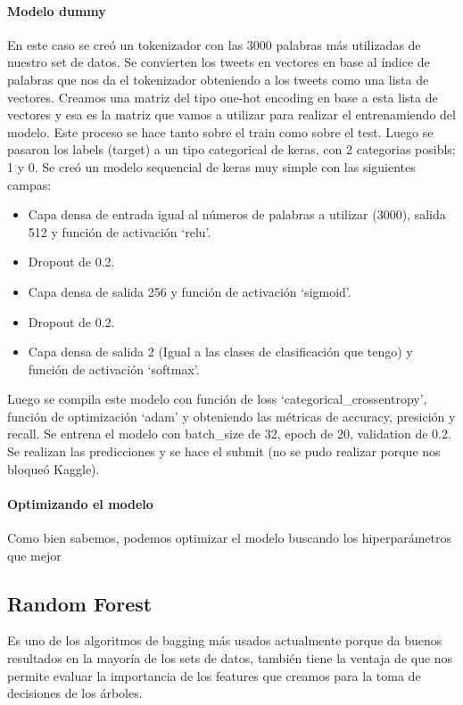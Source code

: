 \documentclass[12pt]{article}
\begin{document}
\paragraph{Modelo dummy\\}
En este caso se creó un tokenizador con las 3000 palabras más utilizadas de nuestro set de datos.
Se convierten los tweets en vectores en base al índice de palabras que nos da el tokenizador obteniendo a los tweets como una lista de vectores.
Creamos una matriz del tipo one-hot encoding en base a esta lista de vectores y esa es la matriz que vamos a utilizar para realizar el entrenamiendo del modelo. Este proceso se hace tanto sobre el train como sobre el test.
Luego se pasaron los labels (target) a un tipo categorical de keras, con 2 categorias posibls: 1 y 0.
Se creó un modelo sequencial de keras muy simple con las siguientes campas:
\begin{itemize}
  \item Capa densa de entrada igual al números de palabras a utilizar (3000), salida 512 y función de activación ‘relu’.
  \item Dropout de 0.2.
  \item Capa densa de salida 256 y función de activación ‘sigmoid’.
  \item Dropout de 0.2.
  \item Capa densa de salida 2 (Igual a las clases de clasificación que tengo) y función de activación ‘softmax’.
\end{itemize}
Luego se compila este modelo con función de loss ‘categorical\_crossentropy’, función de optimización ‘adam’ y obteniendo las métricas de accuracy, presición y recall.
Se entrena el modelo con batch\_size de 32, epoch de 20, validation de 0.2.
Se realizan las predicciones y se hace el submit (no se pudo realizar porque nos bloqueó Kaggle).


\paragraph{Optimizando el modelo\\}
Como bien sabemos, podemos optimizar el modelo buscando los hiperparámetros que mejor 


\subsection{Random Forest}
Es uno de los algoritmos de bagging más usados actualmente porque da buenos resultados en la mayoría de los sets de datos, también tiene la ventaja de que nos permite evaluar la importancia de los features que creamos para la toma de decisiones de los árboles.
\end{document}
